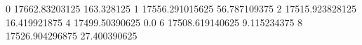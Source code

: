 0 17662.83203125 163.328125
1 17556.291015625 56.787109375
2 17515.923828125 16.419921875
4 17499.50390625 0.0
6 17508.619140625 9.115234375
8 17526.904296875 27.400390625

